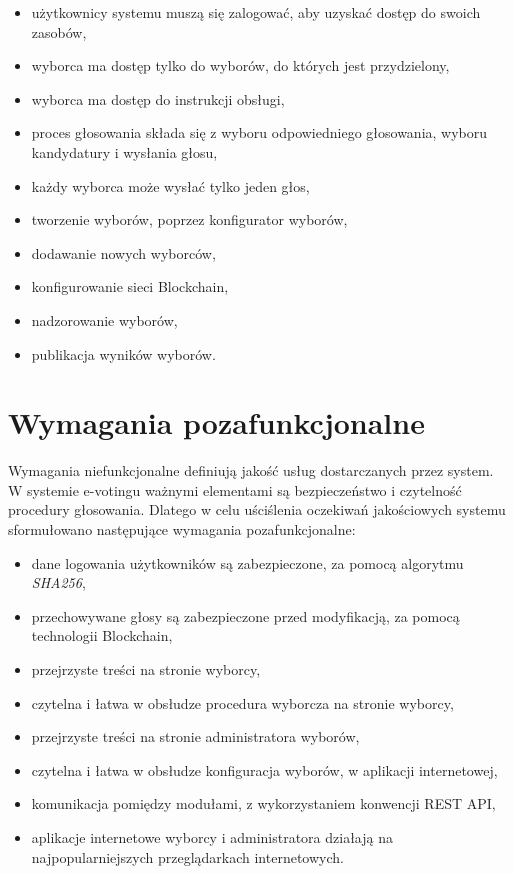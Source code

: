 \documentclass[a4paper,12pt]{book}
\begin{document}
\begin{itemize}
	\item użytkownicy systemu muszą się zalogować, aby uzyskać dostęp do swoich zasobów,
	\item wyborca ma dostęp tylko do wyborów, do których jest przydzielony,
	\item wyborca ma dostęp do instrukcji obsługi,
	\item proces głosowania składa się z wyboru odpowiedniego głosowania, wyboru kandydatury i wysłania głosu,
	\item każdy wyborca może wysłać tylko jeden głos,
	\item tworzenie wyborów, poprzez konfigurator wyborów,
	\item dodawanie nowych wyborców,
	\item konfigurowanie sieci Blockchain,
	\item nadzorowanie wyborów,
	\item publikacja wyników wyborów.
\end{itemize}

\section {Wymagania pozafunkcjonalne}

Wymagania niefunkcjonalne definiują jakość usług dostarczanych przez system. W systemie e-votingu ważnymi elementami są bezpieczeństwo i czytelność procedury głosowania. Dlatego w celu uściślenia oczekiwań jakościowych systemu sformułowano następujące wymagania pozafunkcjonalne:

\begin{itemize}
	\item dane logowania użytkowników są zabezpieczone, za pomocą algorytmu \textit{SHA256},
	\item przechowywane głosy są zabezpieczone przed modyfikacją, za pomocą technologii Blockchain,
	\item przejrzyste treści na stronie wyborcy,
	\item czytelna i łatwa w obsłudze procedura wyborcza na stronie wyborcy,
	\item przejrzyste treści na stronie administratora wyborów,
	\item czytelna i łatwa w obsłudze konfiguracja wyborów, w aplikacji internetowej,
	\item komunikacja pomiędzy modułami, z wykorzystaniem konwencji REST API,
	\item aplikacje internetowe wyborcy i administratora działają na najpopularniejszych przeglądarkach internetowych.
\end{itemize}
\end{document}
